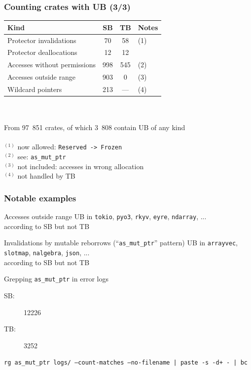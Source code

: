 \begin{frame}
    \frametitle{Counting crates with UB (3/3)}
    \begin{tabular}{|l|c|c|l|}
        \hline
        Kind                         &  SB &  TB & Notes\\
        \hline
        Protector invalidations      &  70 &  58 & \tiny(1) \\
        Protector deallocations      &  12 &  12 & \\
        Accesses without permissions & 998 & 545 & \tiny(2) \\
        Accesses outside range       & 903 &   0 & \tiny(3) \\
        Wildcard pointers            & 213 & --- & \tiny(4) \\
        \hline
    \end{tabular}~\\~\\
    From 97~851 crates, of which 3~808 contain UB of any kind\\~\\

    {\footnotesize
    \(^{(1)}\) now allowed: \texttt{Reserved -> Frozen}\\
    \(^{(2)}\) see: \texttt{as\_mut\_ptr}\\
    \(^{(3)}\) not included: accesses in wrong allocation\\
    \(^{(4)}\) not handled by TB\\
    }
\end{frame}

\begin{frame}
    \frametitle{Notable examples}
    \begin{block}{Accesses outside range}
        UB in \texttt{tokio}, \texttt{pyo3}, \texttt{rkyv}, \texttt{eyre}, \texttt{ndarray}, ...\\
        according to SB but not TB
    \end{block}
    \begin{block}{Invalidations by mutable reborrows (``\texttt{as\_mut\_ptr}'' pattern)}
        UB in \texttt{arrayvec}, \texttt{slotmap}, \texttt{nalgebra}, \texttt{json}, ...\\
        according to SB but not TB
    \end{block}
    \begin{block}{Grepping \texttt{as\_mut\_ptr} in error logs}
        \begin{description}
            \item[SB:] 12226
            \item[TB:] 3252
        \end{description}
        {\scriptsize\texttt{rg as\_mut\_ptr logs/ ---count-matches ---no-filename | paste -s -d+ - | bc}}
    \end{block}
\end{frame}
